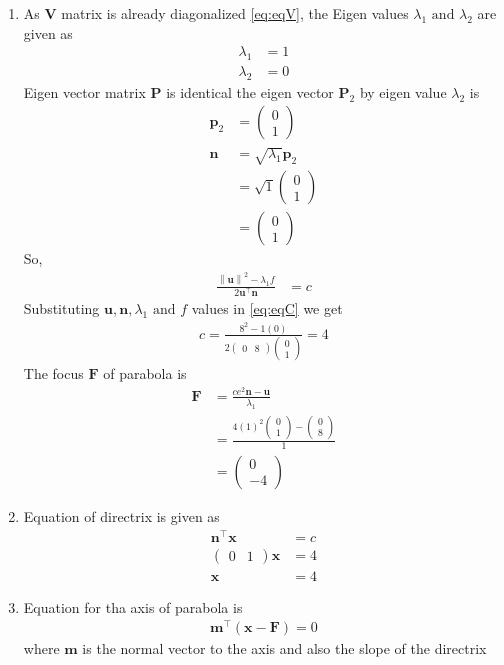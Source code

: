 \documentclass[12pt]{article}
\providecommand{\brak}[1]{\ensuremath{\left(#1\right)}}
\providecommand{\norm}[1]{\left\lVert#1\right\rVert}
\newcommand{\myvec}[1]{\ensuremath{\begin{pmatrix}#1\end{pmatrix}}}
\let\vec\mathbf
\begin{document}
\begin{enumerate}
\item As   $\vec{V}$ matrix is already diagonalized \eqref{eq:eqV}, the Eigen values $\lambda_1 \text{ and } \lambda_2$ are given as
\begin{align}
	\label{eq:eqEigen1}
	\lambda_1 &= 1\\
	\label{eq:eqEigen2}
	\lambda_2 &= 0
\end{align}
Eigen vector matrix $\vec{P}$ is identical the eigen vector $\vec{P}_2$ by eigen value $\lambda_2$ is 
\begin{align}
	\vec{p}_2 &= \myvec{0\\1}\\
	\vec{n} &= \sqrt{\lambda_1}\vec{p}_2\\
		&= \sqrt{1}\myvec{0\\1}\\
		&= \myvec{0\\1}
\end{align}
So,
\begin{align}
	\label{eq:eqC}
	 \frac{\norm{\vec{u}}^2 - \lambda_1 f}{2\vec{u}^\top \vec{n}}&= c
\end{align}
Substituting  $\vec{u},\vec{n},\lambda_1 \text{ and } f$ values in \eqref{eq:eqC} we get 
\begin{align}
	c = \frac{8^2-1\brak{0}}{2\myvec{0&8}\myvec{0\\1}} = 4
\end{align}
The focus $\vec{F}$ of parabola is 
\begin{align}
	\vec{F} &= \frac{ce^2 \vec{n}-\vec{u}}{\lambda_1}\\
		&= \frac{4\brak{1}^2 \myvec{0\\1}-\myvec{0\\8}}{1}\\
		&= \myvec{0\\-4}
\end{align}
\item Equation of directrix is given as
\begin{align}
	\vec{n}^\top \vec{x} &= c\\
	\myvec{0&1}\vec{x} &= 4\\
	\vec{x}&= 4
\end{align}
\item Equation for tha axis of parabola is 
\begin{align}
	\vec{m}^\top \brak{\vec{x}-\vec{F}} = 0\label{20}
\end{align}
where $\vec{m}$ is the normal vector to the axis and also the slope of the directrix

\end{enumerate}
\end{document}
